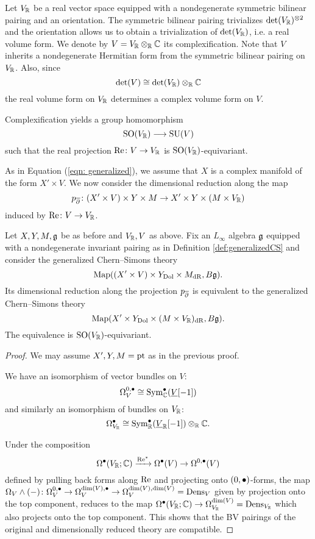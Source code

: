 \documentclass[10pt, oneside]{article}
\begin{document}
Let $V_\mathbb R$ be a real vector space equipped with a nondegenerate symmetric bilinear pairing and an orientation. 
The symmetric bilinear pairing trivializes $\det(V_\mathbb R)^{\otimes 2}$ and the orientation allows us to obtain a trivialization of $\det(V_\mathbb R)$, i.e. a real volume form. 
We denote by $V=V_\mathbb R\otimes_{\mathbb R}\mathbb C$ its complexification. 
Note that $V$ inherits a nondegenerate Hermitian form from the symmetric bilinear pairing on $V_\mathbb R$. 
Also, since
\[\det(V)\cong \det(V_\mathbb R)\otimes_{\mathbb R}\mathbb C\]
the real volume form on $V_\mathbb R$ determines a complex volume form on $V$. 

Complexification yields a group homomorphism
\begin{equation}
\mathrm{SO}(V_\mathbb R)\longrightarrow \mathrm{SU}(V)
\label{eq:SOtoSU}
\end{equation}
such that the real projection $\mathrm{Re}\colon V\rightarrow V_\mathbb R$ is $\mathrm{SO}(V_\mathbb R)$-equivariant.

As in Equation (\ref{eqn: generalized}), we assume that $X$ is a complex manifold of the form $X' \times V$.  We now consider the dimensional reduction along the map
\[
p_{\overline{\partial}}\colon (X' \times V) \times Y \times M \to X' \times Y \times (M \times V_\mathbb R)
\]
induced by ${\rm Re}\colon V \to V_{\mathbb R}$.



\begin{prop} \label{CS_diml_red_prop}
Let $X,Y,M,\mathfrak g$ be as before and $V_\mathbb R, V$ as above. Fix an $L_\infty$ algebra $\mathfrak g$ equipped with a nondegenerate invariant pairing as in Definition \ref{def:generalizedCS} and consider the generalized Chern--Simons theory
\[\operatorname{Map}((X'\times V)\times Y_{\mathrm{Dol}}\times M_{\mathrm{dR}}, B\mathfrak g).\]
Its dimensional reduction along the projection $p_{\overline{\partial}}$ is equivalent to the generalized Chern--Simons theory
\[\operatorname{Map}(X'\times Y_{\mathrm{Dol}}\times (M\times V_\mathbb R)_{\mathrm{dR}}, B\mathfrak g).\]
The equivalence is $\mathrm{SO}(V_\mathbb R)$-equivariant.
\end{prop}
\begin{proof}
We may assume $X',Y,M=\operatorname{pt}$ as in the previous proof.

We have an isomorphism of vector bundles on $V$:
\[\Omega^{0, \bullet}_V\cong {\rm Sym}_\mathbb C^\bullet(\underline{V}[-1])\]
and similarly an isomorphism of bundles on $V_\mathbb R$:
\[\Omega^\bullet_{V_\mathbb R}\cong {\rm Sym}_\mathbb R^\bullet(\underline{V}_\mathbb R[-1])\otimes_\mathbb R\mathbb C.\]

Under the composition
\[\Omega^\bullet(V_\mathbb R; \mathbb C)\xrightarrow{\mathrm{Re}^*} \Omega^\bullet(V)\rightarrow \Omega^{0, \bullet}(V)\]
defined by pulling back forms along $\mathrm{Re}$ and projecting onto $(0,\bullet)$-forms, the map $\Omega_V\wedge (-)\colon \Omega^{0, \bullet}_V \to \Omega^{{\rm dim}(V),\bullet}_V \to \Omega^{\dim(V),\dim(V)}_V = {\rm Dens}_V$ given by projection onto the top component, reduces to the map $\Omega^{\bullet}(V_\mathbb R;\mathbb C)\rightarrow \Omega^{\dim(V)}_{V_\mathbb R} = {\rm Dens}_{V_\mathbb R}$ which also projects onto the top component. 
This shows that the BV pairings of the original and dimensionally reduced theory are compatible. 
\end{proof}
\end{document}
